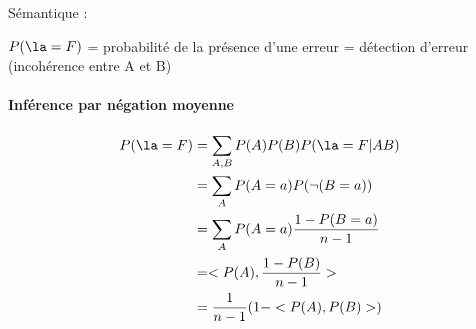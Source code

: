 \documentclass{article}
\begin{document}

 Sémantique : 
 
 $P(\la=F)$ = probabilité de la présence d'une erreur = détection d'erreur (incohérence entre A et B)
 
 \paragraph{Inférence par négation moyenne}
 \begin{align*}
P(\la =F) &=\sum_{A,B}P(A)P(B)P(\la =F|AB) \\
 &=\sum_{A}P(A=a) P(\neg (B=a)) \\
 &=\sum_{A}P(A=a) \frac{1-P(B=a)}{n-1} \\
 &=<P(A),\frac{1-P(B)}{n-1}> \\
 &=\frac{1}{n-1} (1 -<P(A),P(B)>)
 \end{align*}
 
\end{document}
